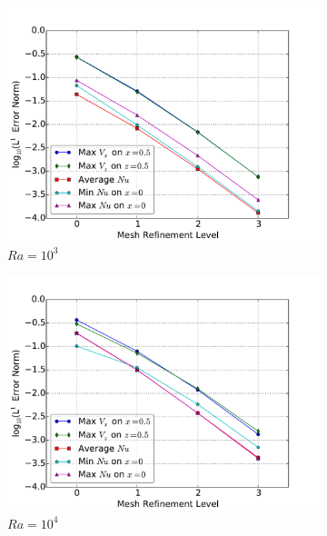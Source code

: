 \begin{figure}[!h]
\centering
\begin{subfigure}{0.48\textwidth}
  \centering
  \includegraphics[width=\linewidth]{figs/Ra1000_mr.pdf}
  \caption{\(Ra=10^3\)}
  \label{fig:mr1}
\end{subfigure}
\begin{subfigure}{0.48\textwidth}
  \centering
  \includegraphics[width=\linewidth]{figs/Ra10000_mr.pdf}
  \caption{\(Ra=10^4\)}
  \label{fig:mr2}
\end{subfigure}
\begin{subfigure}{0.48\textwidth}
  \centering

\end{subfigure}
\end{figure}
